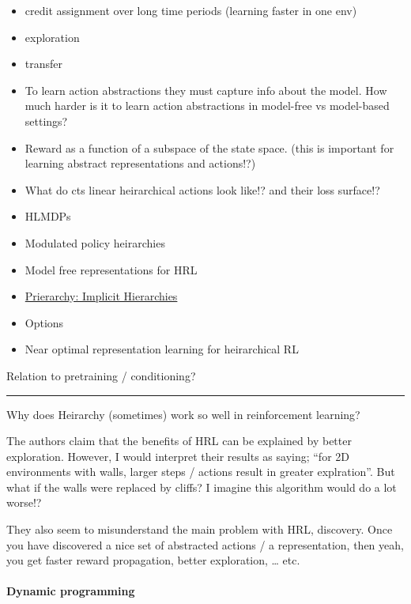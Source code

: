 \begin{itemize}
\item
  credit assignment over long time periods (learning faster in one env)
\item
  exploration
\item
  transfer
\item
  To learn action abstractions they must capture info about the model.
  How much harder is it to learn action abstractions in model-free vs
  model-based settings?
\item
  Reward as a function of a subspace of the state space. (this is
  important for learning abstract representations and actions!?)
\item
  What do cts linear heirarchical actions look like!? and their loss
  surface!?
\item
  HLMDPs \cite{Saxea}
\item
  Modulated policy heirarchies \cite{Pashevich}
\item
  Model free representations for HRL \cite{Rafati}
\item
  \href{https://blog.aqnichol.com/2019/04/03/prierarchy-implicit-hierarchies/}{Prierarchy:
  Implicit Hierarchies}
\item
  Options
\item
  Near optimal representation learning for heirarchical RL \cite{Nachum2018}
\end{itemize}

Relation to pretraining / conditioning?

\begin{center}\rule{0.5\linewidth}{\linethickness}\end{center}

Why does Heirarchy (sometimes) work so well in reinforcement learning?

The authors claim that the benefits of HRL can be explained by better
exploration. However, I would interpret their results as saying; ``for
2D environments with walls, larger steps / actions result in greater
explration''. But what if the walls were replaced by cliffs? I imagine
this algorithm would do a lot worse!?

They also seem to misunderstand the main problem with HRL, discovery.
Once you have discovered a nice set of abstracted actions / a
representation, then yeah, you get faster reward propagation, better
exploration, \ldots{} etc.

\hypertarget{dynamic-programming}{%
\paragraph{Dynamic programming}\label{dynamic-programming}}

